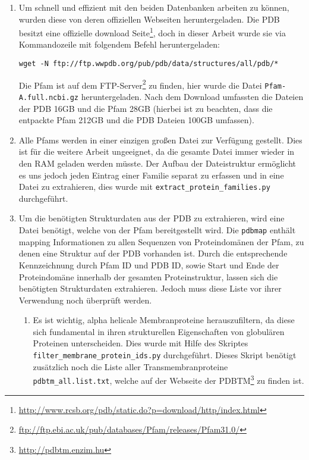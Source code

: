 \begin{enumerate}
\item
    \begin{sloppypar}
    Um schnell und effizient mit den beiden Datenbanken arbeiten zu können, wurden diese von deren offiziellen Webseiten heruntergeladen. Die \ac{PDB} besitzt eine offizielle download Seite\footnote{\url{http://www.rcsb.org/pdb/static.do?p=download/http/index.html}}, doch in dieser Arbeit wurde sie via Kommandozeile mit folgendem Befehl heruntergeladen:
\begin{lstlisting}
wget -N ftp://ftp.wwpdb.org/pub/pdb/data/structures/all/pdb/*
\end{lstlisting}
    Die \ac{Pfam} ist auf dem FTP-Server\footnote{\url{ftp://ftp.ebi.ac.uk/pub/databases/Pfam/releases/Pfam31.0/}} zu finden, hier wurde die Datei \texttt{Pfam-A.full.ncbi.gz} heruntergeladen. Nach dem Download umfassten die Dateien der \ac{PDB} 16GB und die \ac{Pfam} 28GB (hierbei ist zu beachten, dass die entpackte \ac{Pfam} 212GB und die \ac{PDB} Dateien 100GB umfassen).
    \end{sloppypar}
\item
    Alle \ac{Pfams} werden in einer einzigen großen Datei zur Verfügung gestellt. Dies ist für die weitere Arbeit ungeeignet, da die gesamte Datei immer wieder in den \ac{RAM} geladen werden müsste. Der Aufbau der Dateistruktur ermöglicht es uns jedoch jeden Eintrag einer Familie separat zu erfassen und in eine Datei zu extrahieren, dies wurde mit \texttt{extract\_protein\_families.py} durchgeführt.
\item
    Um die benötigten Strukturdaten aus der PDB zu extrahieren, wird eine Datei benötigt, welche von der Pfam bereitgestellt wird. Die \texttt{pdbmap} enthält mapping Informationen zu allen Sequenzen von Proteindomänen der \ac{Pfam}, zu denen eine Struktur auf der \ac{PDB} vorhanden ist. Durch die entsprechende Kennzeichnung durch \ac{Pfam} ID und \ac{PDB} ID, sowie Start und Ende der Proteindomäne innerhalb der gesamten Proteinstruktur, lassen sich die benötigten Strukturdaten extrahieren. Jedoch muss diese Liste vor ihrer Verwendung noch überprüft werden.
    \begin{enumerate}
        \item 
        Es ist wichtig, alpha helicale Membranproteine herauszufiltern, da diese sich fundamental in ihren strukturellen Eigenschaften von globulären Proteinen unterscheiden. Dies wurde mit Hilfe des Skriptes \texttt{filter\_membrane\_protein\_ids.py} durchgeführt. Dieses Skript benötigt zusätzlich noch die Liste aller Transmembranproteine \texttt{pdbtm\_all.list.txt}, welche auf der Webseite der \ac{PDBTM}\footnote{\url{http://pdbtm.enzim.hu}} zu finden ist.

\end{enumerate}
\end{enumerate}
